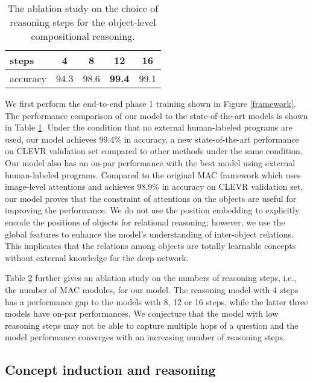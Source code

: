 \documentclass[final]{cvpr}
\begin{document}
\begin{table}[t!]
\begin{tabular}{l|c|p{0.45cm}p{0.45cm}p{0.53cm}p{0.53cm}p{0.53cm}}
         \bottomrule
    \end{tabular}
    \label{sota_comp}
    \vspace{-1mm}
\end{table} \begin{table}[t!]
\small
    \centering
    \caption{\small{The ablation study on the choice of reasoning steps for the object-level compositional reasoning.}}
    \begin{tabular}{l|cccc}
        \toprule
         steps & 4 & 8 & 12 & 16  \\
         \midrule
         accuracy & 94.3 & 98.6 & \textbf{99.4} & 99.1 \\
         \bottomrule
    \end{tabular}
    \label{ablation}
    \vspace{-3mm}
\end{table} We first perform the end-to-end phase 1 training shown in Figure \ref{framework}. The performance comparison of our model to the state-of-the-art models is shown in Table \ref{sota_comp}. Under the condition that no external human-labeled programs are used, our model achieves 99.4\% in accuracy, a new state-of-the-art performance on CLEVR validation set compared to other methods under the same condition. Our model also has an on-par performance with the best model \cite{yi2018neural} using external human-labeled programs. Compared to the original MAC \cite{hudson2018compositional} framework which uses image-level attentions and achieves 98.9\% in accuracy on CLEVR validation set, our model proves that the constraint of attentions on the objects are useful for improving the performance. We do not use the position embedding to explicitly encode the positions of objects for relational reasoning; however, we use the global features to enhance the model's understanding of inter-object relations. This implicates that the relations among objects are totally learnable concepts without external knowledge for the deep network. 

Table \ref{ablation} further gives an ablation study on the numbers of reasoning steps, i.e., the number of MAC modules, for our model. The reasoning model with 4 steps has a performance gap to the models with 8, 12 or 16 steps, while the latter three models have on-par performances. We conjecture that the model with low reasoning steps may not be able to capture multiple hops of a question and the model performance converges with an increasing number of reasoning steps.

\subsection{Concept induction and reasoning}
\end{document}
